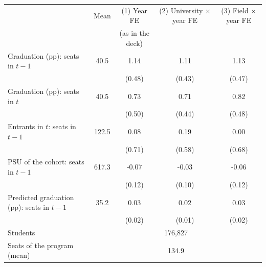 \begin{tabular}{lcccc}
\toprule
 & Mean & (1) Year FE & (2) University \(\times\) year FE & (3) Field \(\times\) year FE \\
 & & (as in the deck) & & \\
\midrule
 Graduation (pp): seats in \(t-1\) &  40.5 &   1.14\sym{**} &   1.11\sym{**} &   1.13\sym{**} \\
 & & (0.48) & (0.43) & (0.47) \\
 Graduation (pp): seats in \(t\) &  40.5 &   0.73 &   0.71 &   0.82\sym{*} \\
 & & (0.50) & (0.44) & (0.48) \\
\addlinespace
 Entrants in \(t\): seats in \(t-1\) & 122.5 &   0.08 &   0.19 &   0.00 \\
 & & (0.71) & (0.58) & (0.68) \\
 PSU of the cohort: seats in \(t-1\) & 617.3 &  -0.07 &  -0.03 &  -0.06 \\
 & & (0.12) & (0.10) & (0.12) \\
 Predicted graduation (pp): seats in \(t-1\) &  35.2 &   0.03 &   0.02 &   0.03 \\
 & & (0.02) & (0.01) & (0.02) \\
\midrule
Students & \multicolumn{4}{c}{  176,827} \\
Seats of the program (mean) & \multicolumn{4}{c}{134.9} \\
\bottomrule
\end{tabular}
